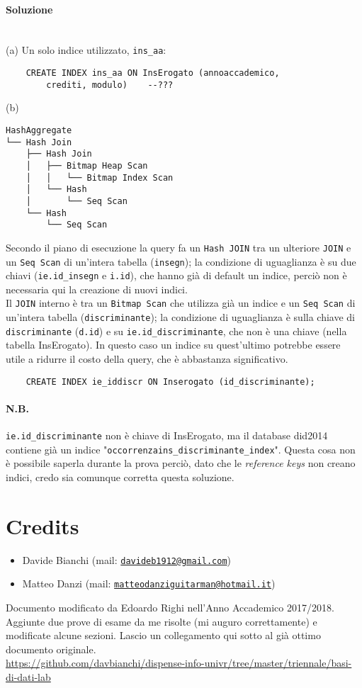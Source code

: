 \documentclass[a4paper, 10pt, titlepage]{article}
\newcommand{\mail}[1]{\href{mailto:#1}{\texttt{#1}}}
\begin{document}
\paragraph{Soluzione}\dotfill
\\(a) Un solo indice utilizzato, \lstinline|ins_aa|:
\begin{lstlisting}
	CREATE INDEX ins_aa ON InsErogato (annoaccademico, 
		crediti, modulo)	--???
\end{lstlisting}
(b) 
\begin{verbatim}
HashAggregate
└── Hash Join
    ├── Hash Join
    │   ├── Bitmap Heap Scan
    │   │   └── Bitmap Index Scan
    │   └── Hash
    │       └── Seq Scan
    └── Hash
        └── Seq Scan
\end{verbatim}
Secondo il piano di esecuzione la query fa un \lstinline|Hash JOIN| tra un ulteriore \lstinline|JOIN| e un \lstinline|Seq Scan| di un'intera tabella (\lstinline|insegn|); la condizione di uguaglianza è su due chiavi (\lstinline|ie.id_insegn| e \lstinline|i.id|), che hanno già di default un indice, perciò non è necessaria qui la creazione di nuovi indici.\\
Il \lstinline|JOIN| interno è tra un \lstinline|Bitmap Scan| che utilizza già un indice e un \lstinline|Seq Scan| di un'intera tabella (\lstinline|discriminante|); la condizione di uguaglianza è sulla chiave di \lstinline|discriminante| (\lstinline|d.id|) e su \lstinline|ie.id_discriminante|, che non è una chiave (nella tabella InsErogato). In questo caso un indice su quest'ultimo potrebbe essere utile a ridurre il costo della query, che è abbastanza significativo.
\begin{lstlisting}
	CREATE INDEX ie_iddiscr ON Inserogato (id_discriminante);
\end{lstlisting}
\paragraph{N.B.} \lstinline|ie.id_discriminante| non è chiave di InsErogato, ma il database did2014 contiene già un indice "\lstinline|occorrenzains_discriminante_index|". Questa cosa non è possibile saperla durante la prova perciò, dato che le \textit{reference keys} non creano indici, credo sia comunque corretta questa soluzione.
\newpage

\section{Credits}
\begin{itemize}
\item Davide Bianchi (mail: \mail{davideb1912@gmail.com})
\item Matteo Danzi (mail: \mail{matteodanziguitarman@hotmail.it})
\end{itemize}
Documento modificato da Edoardo Righi nell'Anno Accademico 2017/2018. Aggiunte due prove di esame da me risolte (mi auguro correttamente) e modificate alcune sezioni. Lascio un collegamento qui sotto al già ottimo documento originale. \medskip \\
{\scriptsize \url{https://github.com/davbianchi/dispense-info-univr/tree/master/triennale/basi-di-dati-lab}}
			
\end{document}
